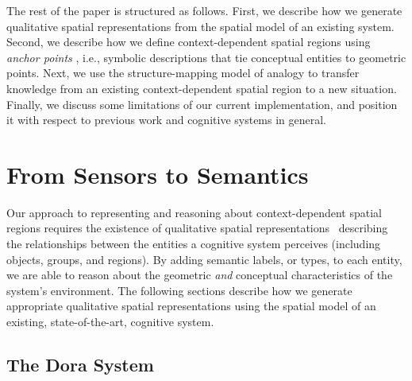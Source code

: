 \documentclass[letterpaper]{article}
\begin{document}
The rest of the paper is structured as follows. First, we describe how we generate qualitative spatial representations from the spatial model of an existing system. Second, we describe how we define context-dependent spatial regions using \textit{anchor points} \cite{Klenk/etal2005}, i.e., symbolic descriptions that tie conceptual entities to geometric points. Next, we use the structure-mapping model of analogy \cite{Gentner1983a} to transfer knowledge from an existing context-dependent spatial region to a new situation. Finally, we discuss some limitations of our current implementation, and position it with respect to previous work and cognitive systems in general.

\section{From Sensors to Semantics}

Our approach to representing and reasoning about context-dependent spatial regions requires the existence of qualitative spatial representations~\cite{Cohn:2001} describing the relationships between the entities a cognitive system perceives (including objects, groups, and regions). By adding semantic labels, or types, to each entity, we are able to reason about the geometric \emph{and} conceptual characteristics of the system's environment. The following sections describe how we generate appropriate qualitative spatial representations using the spatial model of an existing, state-of-the-art, cognitive system.

\subsection{The Dora System}
\end{document}
